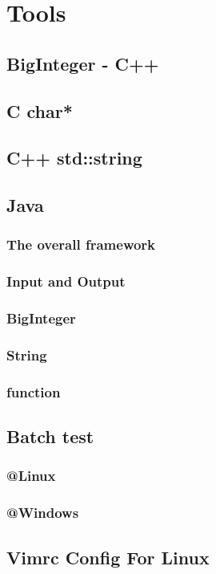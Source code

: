 \section{Tools}
	\subsection{BigInteger - C++}
		
	\subsection{C char*}
		
	\subsection{C++ std::string}
		
	\subsection{Java}
		\subsubsection{The overall framework}
			
		\subsubsection{Input and Output}
			
		\subsubsection{BigInteger}
			
		\subsubsection{String}
			
		\subsubsection{function}
			
	\subsection{Batch test}
		\subsubsection{@Linux}
			
		\subsubsection{@Windows}
			
	\subsection{Vimrc Config For Linux}
		
